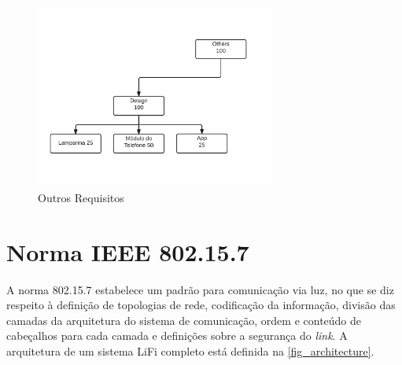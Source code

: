 	\begin{figure}[h!]
		\caption{\label{fig_req3} Outros Requisitos}
		\centering
		\includegraphics[width=0.7\textwidth, trim={1cm 4cm 3cm 4cm}, clip]{ReqTree3.pdf}
	\end{figure}
	
	\section{Norma IEEE 802.15.7}\label{sec-norma}
	
	A norma 802.15.7 estabelece um padrão para comunicação via luz, no que se diz respeito à definição de topologias de rede, codificação da informação, divisão das camadas da arquitetura do sistema de comunicação, ordem e conteúdo de cabeçalhos para cada camada e definições sobre a segurança do \textit{link}. A arquitetura de um sistema LiFi completo está definida na \autoref{fig_architecture}.
	
